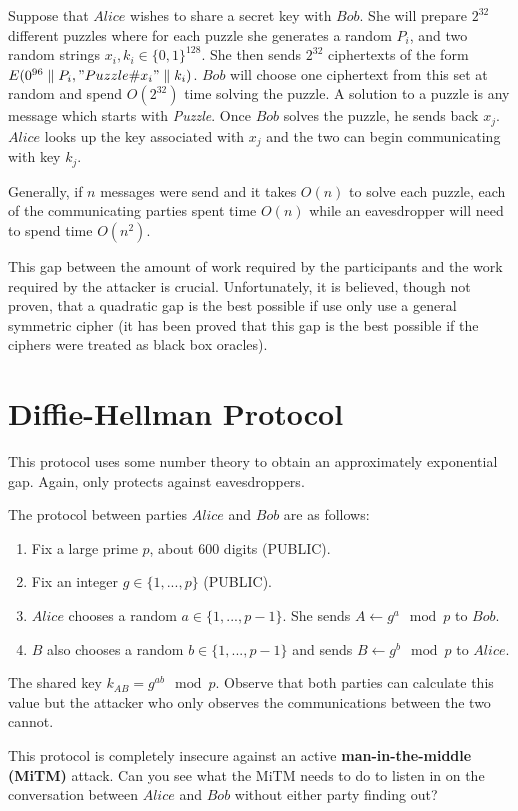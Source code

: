 \documentclass[twoside]{article}
\begin{document}
Suppose that $Alice$ wishes to share a secret key with $Bob$. She will prepare $2^{32}$ different puzzles where for each puzzle she generates a random $P_i$,  and two random strings $x_i, k_i \in \{0,1\}^{128}$. She then sends $2^{32}$ ciphertexts of the form $E(0^{96}\parallel P_i, "Puzzle \# x_i" \parallel k_i)$. $Bob$ will choose one ciphertext from this set at random and spend $O(2^32)$ time solving the puzzle. A solution to a puzzle is any message which starts with \emph{Puzzle}. Once $Bob$ solves the puzzle, he sends back $x_j$. $Alice$ looks up the key associated with $x_j$ and the two can begin communicating with key $k_j$.

Generally, if $n$ messages were send and it takes $O(n)$ to solve each puzzle, each of the communicating parties spent time $O(n)$ while an eavesdropper will need to spend time $O(n^2)$.

This gap between the amount of work required by the participants and the work required by the attacker is crucial. Unfortunately, it is believed, though not proven, that a quadratic gap is the best possible if use only use a general symmetric cipher (it has been proved that this gap is the best possible if the ciphers were treated as black box oracles).

\section{Diffie-Hellman Protocol}
This protocol uses some number theory to obtain an approximately exponential gap. Again, only protects against eavesdroppers.

The protocol between parties $Alice$ and $Bob$ are as follows:
\begin{enumerate}
\item Fix a large prime $p$, about 600 digits (PUBLIC).
\item Fix an integer $g \in \{1, ..., p\}$ (PUBLIC).
\item $Alice$ chooses a random $a \in \{1, ..., p-1\}$. She sends $A \leftarrow g^a \mod p$ to $Bob$.
\item $B$ also chooses a random $b \in \{1, ..., p-1\}$ and sends $B \leftarrow g^b \mod p$ to $Alice$.
\end{enumerate}

The shared key $k_{AB} = g^{ab} \mod p$. Observe that both parties can calculate this value but the attacker who only observes the communications between the two cannot.

This protocol is completely insecure against an active \textbf{man-in-the-middle (MiTM)} attack. Can you see what the MiTM needs to do to listen in on the conversation between $Alice$ and $Bob$ without either party finding out? 
\end{document}

